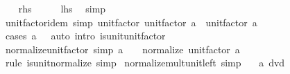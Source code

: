 \begin{isabellebody}
\isamarkupfalse%
\isanewline
\ \ \isamarkupfalse%
\ {\isacharquery}{\kern0pt}rhs\isanewline
\ \ \isamarkupfalse%
\ \isamarkupfalse%
\ {\isacharquery}{\kern0pt}lhs\ \isamarkupfalse%
\ simp\isanewline
{}\isamarkupfalse%
%
\endisatagproof
{\isafoldproof}%
%
\isadelimproof
\isanewline
%
\endisadelimproof
\isanewline
{}\isamarkupfalse%
\ unit{\isacharunderscore}{\kern0pt}factor{\isacharunderscore}{\kern0pt}idem\ {\isacharbrackleft}{\kern0pt}simp{\isacharbrackright}{\kern0pt}{\isacharcolon}{\kern0pt}\ {\isachardoublequoteopen}unit{\isacharunderscore}{\kern0pt}factor\ {\isacharparenleft}{\kern0pt}unit{\isacharunderscore}{\kern0pt}factor\ a{\isacharparenright}{\kern0pt}\ {\isacharequal}{\kern0pt}\ unit{\isacharunderscore}{\kern0pt}factor\ a{\isachardoublequoteclose}\isanewline
%
\isadelimproof
\ \ %
\endisadelimproof
%
\isatagproof
{}\isamarkupfalse%
\ {\isacharparenleft}{\kern0pt}cases\ {\isachardoublequoteopen}a\ {\isacharequal}{\kern0pt}\ {}{\isachardoublequoteclose}{\isacharparenright}{\kern0pt}\ {\isacharparenleft}{\kern0pt}auto\ intro{\isacharcolon}{\kern0pt}\ is{\isacharunderscore}{\kern0pt}unit{\isacharunderscore}{\kern0pt}unit{\isacharunderscore}{\kern0pt}factor{\isacharparenright}{\kern0pt}%
\endisatagproof
{\isafoldproof}%
%
\isadelimproof
\isanewline
%
\endisadelimproof
\isanewline
{}\isamarkupfalse%
\ normalize{\isacharunderscore}{\kern0pt}unit{\isacharunderscore}{\kern0pt}factor\ {\isacharbrackleft}{\kern0pt}simp{\isacharbrackright}{\kern0pt}{\isacharcolon}{\kern0pt}\ {\isachardoublequoteopen}a\ {\isasymnoteq}\ {}\ {\isasymLongrightarrow}\ normalize\ {\isacharparenleft}{\kern0pt}unit{\isacharunderscore}{\kern0pt}factor\ a{\isacharparenright}{\kern0pt}\ {\isacharequal}{\kern0pt}\ {}{\isachardoublequoteclose}\isanewline
%
\isadelimproof
\ \ %
\endisadelimproof
%
\isatagproof
{}\isamarkupfalse%
\ {\isacharparenleft}{\kern0pt}rule\ is{\isacharunderscore}{\kern0pt}unit{\isacharunderscore}{\kern0pt}normalize{\isacharparenright}{\kern0pt}\ simp%
\endisatagproof
{\isafoldproof}%
%
\isadelimproof
\isanewline
%
\endisadelimproof
\isanewline
{}\isamarkupfalse%
\ normalize{\isacharunderscore}{\kern0pt}mult{\isacharunderscore}{\kern0pt}unit{\isacharunderscore}{\kern0pt}left\ {\isacharbrackleft}{\kern0pt}simp{\isacharbrackright}{\kern0pt}{\isacharcolon}{\kern0pt}\isanewline
\ \ \ {\isachardoublequoteopen}a\ dvd\ {}{\isachardoublequoteclose}\isanewline

\end{isabellebody}
